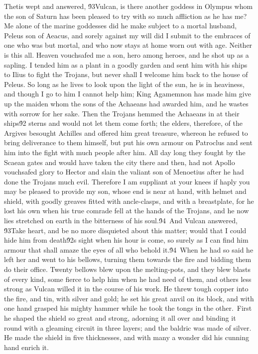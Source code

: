 {Thetis wept and answered, \'93Vulcan, is there another goddess in Olympus whom the son of Saturn has been pleased to try with so much affliction as he has me? Me alone of the marine goddesses did he make subject to a mortal husband, Peleus son of Aeacus, and sorely against my will did I submit to the embraces of one who was but mortal, and who now stays at home worn out with age. Neither is this all. Heaven vouchsafed me a son, hero among heroes, and he shot up as a sapling. I tended him as a plant in a goodly garden and sent him with his ships to Ilius to fight the Trojans, but never shall I welcome him back to the house of Peleus. So long as he lives to look upon the light of the sun, he is in heaviness, and though I go to him I cannot help him; King Agamemnon has made him give up the maiden whom the sons of the Achaeans had awarded him, and he wastes with sorrow for her sake. Then the Trojans hemmed the Achaeans in at their ships\'92 sterns and would not let them come forth; the elders, therefore, of the Argives besought Achilles and offered him great treasure, whereon he refused to bring deliverance to them himself, but put his own armour on Patroclus and sent him into the fight with much people after him. All day long they fought by the Scaean gates and would have taken the city there and then, had not Apollo vouchsafed glory to Hector and slain the valiant son of Menoetius after he had done the Trojans much evil. Therefore I am suppliant at your knees if haply you may be pleased to provide my son, whose end is near at hand, with helmet and shield, with goodly greaves fitted with ancle-clasps, and with a breastplate, for he lost his own when his true comrade fell at the hands of the Trojans, and he now lies stretched on earth in the bitterness of his soul.\'94\
And Vulcan answered, \'93Take heart, and be no more disquieted about this matter; would that I could hide him from death\'92s sight when his hour is come, so surely as I can find him armour that shall amaze the eyes of all who behold it.\'94\
When he had so said he left her and went to his bellows, turning them towards the fire and bidding them do their office. Twenty bellows blew upon the melting-pots, and they blew blasts of every kind, some fierce to help him when he had need of them, and others less strong as Vulcan willed it in the course of his work. He threw tough copper into the fire, and tin, with silver and gold; he set his great anvil on its block, and with one hand grasped his mighty hammer while he took the tongs in the other.\
First he shaped the shield so great and strong, adorning it all over and binding it round with a gleaming circuit in three layers; and the baldric was made of silver. He made the shield in five thicknesses, and with many a wonder did his cunning hand enrich it.\
}
